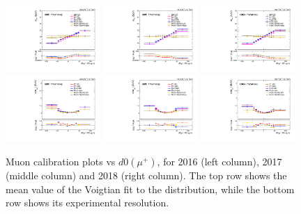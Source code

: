 \begin{figure}[!htb]
      \centering
      \captionsetup{justification=justified}
      \includegraphics[width=0.32\textwidth]{pics/muon_corr/muon_cal/2016/muP_d0_rebin_summary_mean.pdf}
      \includegraphics[width=0.32\textwidth]{pics/muon_corr/muon_cal/2017/muP_d0_rebin_summary_mean.pdf}
      \includegraphics[width=0.32\textwidth]{pics/muon_corr/muon_cal/2018/muP_d0_rebin_summary_mean.pdf}
      \includegraphics[width=0.32\textwidth]{pics/muon_corr/muon_cal/2016/muP_d0_rebin_summary_reso.pdf}
      \includegraphics[width=0.32\textwidth]{pics/muon_corr/muon_cal/2017/muP_d0_rebin_summary_reso.pdf}
      \includegraphics[width=0.32\textwidth]{pics/muon_corr/muon_cal/2018/muP_d0_rebin_summary_reso.pdf}
      \caption{Muon calibration plots vs $d0(\mu^{+})$, for 2016 (left column), 2017 (middle column) and 2018 (right column).
               The top row shows the mean value of the Voigtian fit to the \mmm distribution, 
               while the bottom row shows its experimental resolution.}
      \label{fig:mucal_muP_d0}
\end{figure}


